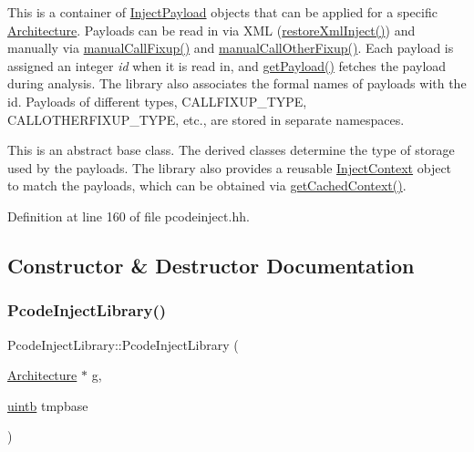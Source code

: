 This is a container of \mbox{\hyperlink{class_inject_payload}{Inject\+Payload}} objects that can be applied for a specific \mbox{\hyperlink{class_architecture}{Architecture}}. Payloads can be read in via X\+ML (\mbox{\hyperlink{class_pcode_inject_library_a738666065a924346cf552b1d62c84848}{restore\+Xml\+Inject()}}) and manually via \mbox{\hyperlink{class_pcode_inject_library_a0e360443cbc6ff94ea71d197882c55a8}{manual\+Call\+Fixup()}} and \mbox{\hyperlink{class_pcode_inject_library_a93f4e4b0f75d81b96bd92623d392269a}{manual\+Call\+Other\+Fixup()}}. Each payload is assigned an integer {\itshape id} when it is read in, and \mbox{\hyperlink{class_pcode_inject_library_a6075295c64a06ab05e954dc6f18945f9}{get\+Payload()}} fetches the payload during analysis. The library also associates the formal names of payloads with the id. Payloads of different types, C\+A\+L\+L\+F\+I\+X\+U\+P\+\_\+\+T\+Y\+PE, C\+A\+L\+L\+O\+T\+H\+E\+R\+F\+I\+X\+U\+P\+\_\+\+T\+Y\+PE, etc., are stored in separate namespaces.

This is an abstract base class. The derived classes determine the type of storage used by the payloads. The library also provides a reusable \mbox{\hyperlink{class_inject_context}{Inject\+Context}} object to match the payloads, which can be obtained via \mbox{\hyperlink{class_pcode_inject_library_a3a1ca9f7ea2cea02de1141cc35c79b18}{get\+Cached\+Context()}}. 

Definition at line 160 of file pcodeinject.\+hh.



\subsection{Constructor \& Destructor Documentation}
\mbox{\label{class_pcode_inject_library_a13fae9d7af655217a5612e4837d1f269}} 
\subsubsection{\texorpdfstring{PcodeInjectLibrary()}{PcodeInjectLibrary()}}
{\footnotesize\ttfamily Pcode\+Inject\+Library\+::\+Pcode\+Inject\+Library (\begin{DoxyParamCaption}\item[{\mbox{\hyperlink{class_architecture}{Architecture}} $\ast$}]{g,  }\item[{\mbox{\hyperlink{types_8h_a2db313c5d32a12b01d26ac9b3bca178f}{uintb}}}]{tmpbase }\end{DoxyParamCaption})\hspace{0.3cm}{\ttfamily [inline]}}



